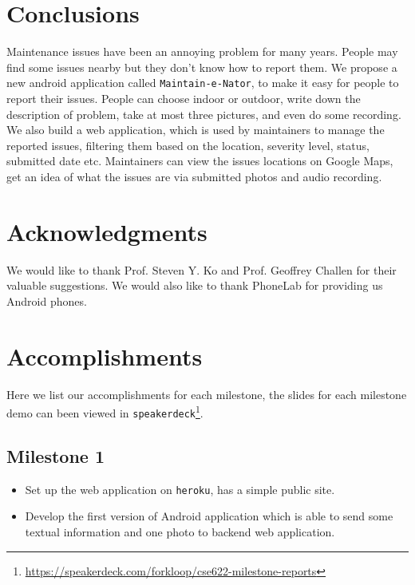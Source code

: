 \documentclass{acm_proc_article-sp}
\begin{document}
\section{Conclusions}
Maintenance issues have been an annoying problem for many years. People may find some issues nearby but they don't know how to report them. 
We propose a new android application called \texttt{Maintain-e-Nator}, to make it easy for people to report their issues. People can choose indoor or outdoor, 
write down the description of problem, take at most three pictures, and even do some recording. We also build a web application, 
which is used by maintainers to manage the reported issues, filtering them based on the location, severity level, status, submitted date etc. 
Maintainers can view the issues locations on Google Maps, get an idea of what the issues are via submitted photos and audio recording.

\section{Acknowledgments}
We would like to thank Prof. Steven Y. Ko and Prof. Geoffrey Challen for their valuable suggestions. We would also like to thank 
PhoneLab for providing us Android phones.



\balancecolumns

\clearpage
\appendix
\section{Accomplishments}
Here we list our accomplishments for each milestone, 
the slides for each milestone demo can been viewed in \texttt{speakerdeck}\footnote{\url{https://speakerdeck.com/forkloop/cse622-milestone-reports}}.
\subsection{Milestone 1}
\begin{itemize}
\item
Set up the web application on \texttt{heroku}, has a simple public site.
\item
Develop the first version of Android application which is able to send some textual information and one photo to backend web application.
\end{itemize}
\end{document}
